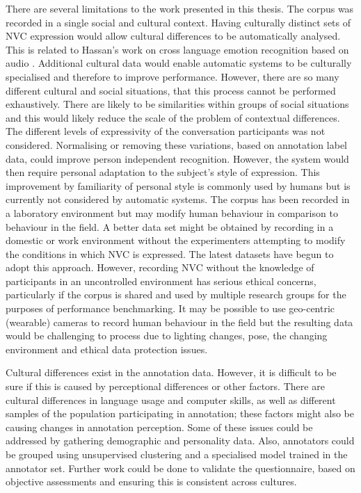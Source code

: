 There are several limitations to the work presented in this thesis. The corpus was recorded in a single social and cultural context. Having culturally distinct sets of \ac{NVC} expression would allow cultural differences to be automatically analysed. This is related to Hassan's work on cross language emotion recognition based on audio \cite{Hassan2012}. Additional cultural data would enable automatic systems to be culturally specialised and therefore to improve performance. However, there are so many different cultural and social situations, that this process cannot be performed exhaustively. There are likely to be similarities within groups of social situations and this would likely reduce the scale of the problem of contextual differences. The different levels of expressivity of the conversation participants was not considered. Normalising or removing these variations, based on annotation label data, could improve person independent recognition. However, the system would then require personal adaptation to the subject's style of expression. This improvement by familiarity of personal style is commonly used by humans but is currently not considered by automatic systems. The corpus has been recorded in a laboratory environment but may modify human behaviour in comparison to behaviour in the field. A better data set might be obtained by recording in a domestic or work environment without the experimenters attempting to modify the conditions in which \ac{NVC} is expressed. The latest datasets have begun to adopt this approach. However, recording \ac{NVC} without the knowledge of participants in an uncontrolled environment has serious ethical concerns, particularly if the corpus is shared and used by multiple research groups for the purposes of performance benchmarking. It may be possible to use geo-centric (wearable) cameras to record human behaviour in the field but the resulting data would be challenging to process due to lighting changes, pose, the changing environment and ethical data protection issues.

Cultural differences exist in the annotation data. However, it is difficult to be sure if this is caused by perceptional differences or other factors. There are cultural differences in language usage and computer skills, as well as different samples of the population participating in annotation; these factors might also be causing changes in annotation perception. Some of these issues could be addressed by gathering demographic and personality data. Also, annotators could be grouped using unsupervised clustering and a specialised model trained in the annotator set. %
Further work could be done to validate the questionnaire, based on objective assessments and ensuring this is consistent across cultures.

